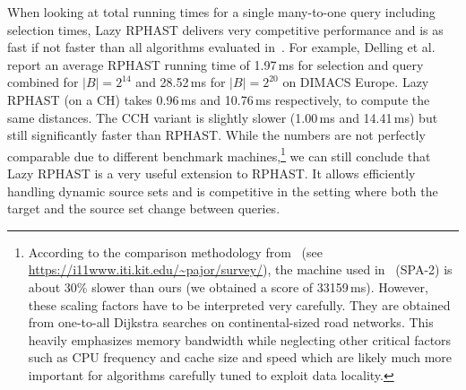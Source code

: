 \documentclass[manuscript,review]{acmart}
\begin{document}
When looking at total running times for a single many-to-one query including selection times, Lazy RPHAST delivers very competitive performance and is as fast if not faster than all algorithms evaluated in~\cite{delling_et_al:OASIcs:2011:3266}.
For example, Delling et al. report an average RPHAST running time of 1.97\,ms for selection and query combined for $|B| = 2^{14}$ and 28.52\,ms for $|B| = 2^{20}$ on DIMACS Europe.
Lazy RPHAST (on a CH) takes 0.96\,ms and 10.76\,ms respectively, to compute the same distances.
The CCH variant is slightly slower (1.00\,ms and 14.41\,ms) but still significantly faster than RPHAST.
While the numbers are not perfectly comparable due to different benchmark machines,\footnote{
According to the comparison methodology from~\cite{BastDGMPSWW16} (see \url{https://i11www.iti.kit.edu/~pajor/survey/}), the machine used in~\cite{delling_et_al:OASIcs:2011:3266} (SPA-2) is about 30\% slower than ours (we obtained a score of 33159\,ms).
However, these scaling factors have to be interpreted very carefully.
They are obtained from one-to-all Dijkstra searches on continental-sized road networks.
This heavily emphasizes memory bandwidth while neglecting other critical factors such as CPU frequency and cache size and speed which are likely much more important for algorithms carefully tuned to exploit data locality.
} we can still conclude that Lazy RPHAST is a very useful extension to RPHAST.
It allows efficiently handling dynamic source sets and is competitive in the setting where both the target and the source set change between queries.


\end{document}
